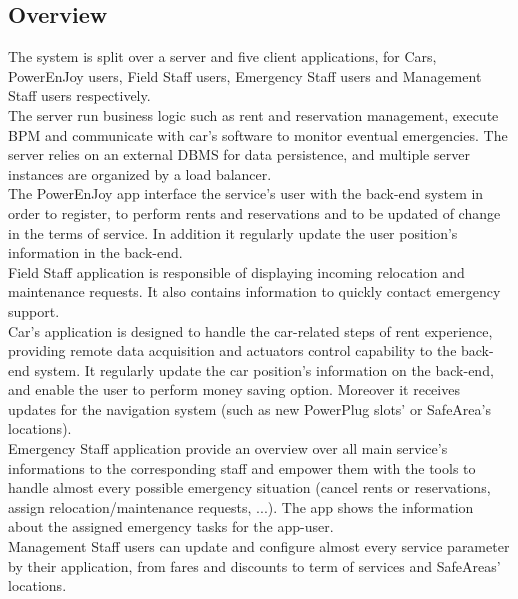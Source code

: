 \documentclass[english]{article}
\begin{document}
	\subsection{Overview}%
				The system is split over a server and five client applications, for Cars,  PowerEnJoy users, Field Staff users, Emergency Staff users and Management Staff users respectively.\\
		The server  run business logic such as rent and reservation management, execute BPM and communicate with car's software to monitor eventual emergencies.
		The server relies on an external DBMS for data persistence, and multiple server instances are organized by a load balancer.\\
		The PowerEnJoy app interface the service's user with the back-end system in order  to register, to perform rents and reservations and to be updated of change in the terms of service. In addition it regularly update the user position's information in the back-end. \\
		Field Staff application is responsible of displaying incoming relocation and maintenance requests. It also contains information to quickly contact emergency support. \\
		Car's application is designed to handle the car-related steps of rent experience, providing remote data acquisition and actuators control capability to the back-end system.
		It regularly update the car position's information on the back-end, and enable the user to perform money saving option. Moreover it receives updates for the navigation system (such as new PowerPlug slots' or SafeArea's locations). \\
		Emergency Staff application provide an overview over all main service's informations to the corresponding staff and empower them with the tools to handle almost every possible emergency situation (cancel rents or reservations, assign relocation/maintenance requests, ...).  The app shows the information about the assigned emergency tasks for the app-user. \\
		Management Staff users can update and configure almost every service parameter by their application, from fares and discounts to term of services and SafeAreas' locations.
\end{document}
